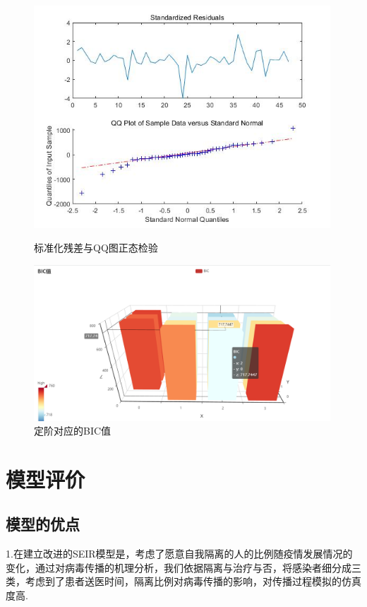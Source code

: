 \documentclass{whutmod}
\begin{document}
	\begin{figure}[!htbp]
		\begin{minipage}[t]{0.5\textwidth}
			\centering
			\includegraphics[width=0.99\textwidth]{qq.jpg}
			\caption{标准化残差与QQ图正态检验}
		\end{minipage}
		\qquad
		\begin{minipage}[t]{0.5\textwidth}
			\centering
			\includegraphics[width=0.99\textwidth]{bci.png}
			\caption{定阶对应的BIC值}
		\end{minipage}
	\end{figure}
	\newpage
	\section{模型评价}
	\subsection{模型的优点}
	1.在建立改进的SEIR模型是，考虑了愿意自我隔离的人的比例随疫情发展情况的变化，通过对病毒传播的机理分析，我们依据隔离与治疗与否，将感染者细分成三类，考虑到了患者送医时间，隔离比例对病毒传播的影响，对传播过程模拟的仿真度高.
	
\end{document}
